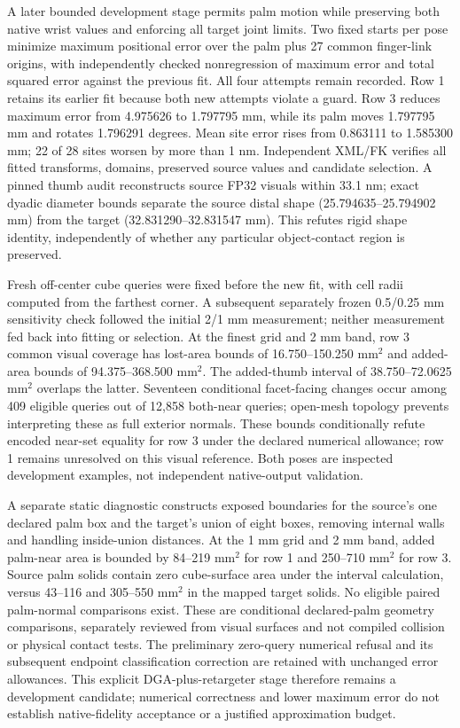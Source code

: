 \documentclass[10pt,letterpaper]{article}
\begin{document}
A later bounded development stage permits palm motion while preserving both
native wrist values and enforcing all target joint limits. Two fixed starts per
pose minimize maximum positional error over the palm plus 27 common finger-link
origins, with independently checked nonregression of maximum error and total
squared error against the previous fit. All four attempts remain recorded. Row 1
retains its earlier fit because both new attempts violate a guard. Row 3 reduces
maximum error from 4.975626 to 1.797795 mm, while its palm moves 1.797795 mm and
rotates 1.796291 degrees. Mean site error rises from 0.863111 to 1.585300 mm;
22 of 28 sites worsen by more than 1 nm. Independent XML/FK verifies all fitted
transforms, domains, preserved source values and candidate selection. A pinned
thumb audit reconstructs source FP32 visuals within 33.1 nm; exact dyadic diameter
bounds separate the source distal shape (25.794635--25.794902 mm) from the target
(32.831290--32.831547 mm). This refutes rigid shape identity, independently of
whether any particular object-contact region is preserved.

Fresh off-center cube queries were fixed before the new fit, with cell radii
computed from the farthest corner. A subsequent separately frozen 0.5/0.25 mm
sensitivity check followed the initial 2/1 mm measurement; neither measurement
fed back into fitting or selection. At the finest grid and 2 mm band, row 3
common visual coverage has lost-area bounds of 16.750--150.250 mm$^2$ and
added-area bounds of 94.375--368.500 mm$^2$. The added-thumb interval of
38.750--72.0625 mm$^2$ overlaps the latter. Seventeen conditional facet-facing
changes occur among 409 eligible queries out of 12,858 both-near queries;
open-mesh topology prevents interpreting these as full exterior normals.
These bounds conditionally refute encoded near-set equality for row 3 under
the declared numerical allowance; row 1 remains unresolved on this visual
reference. Both poses are inspected development examples, not independent
native-output validation.

A separate static diagnostic constructs exposed boundaries for the source's
one declared palm box and the target's union of eight boxes, removing internal
walls and handling inside-union distances. At the 1 mm grid and 2 mm band,
added palm-near area is bounded by 84--219 mm$^2$ for row 1 and
250--710 mm$^2$ for row 3. Source palm solids contain zero cube-surface area
under the interval calculation, versus 43--116 and 305--550 mm$^2$ in the mapped
target solids. No eligible paired palm-normal comparisons exist. These are
conditional declared-palm geometry comparisons, separately reviewed from
visual surfaces and not compiled collision or physical contact tests.
The preliminary zero-query numerical refusal and its subsequent endpoint
classification correction are retained with unchanged error allowances.
This explicit DGA-plus-retargeter stage therefore remains a development
candidate; numerical correctness and lower maximum error do not establish
native-fidelity acceptance or a justified approximation budget.
\end{document}
